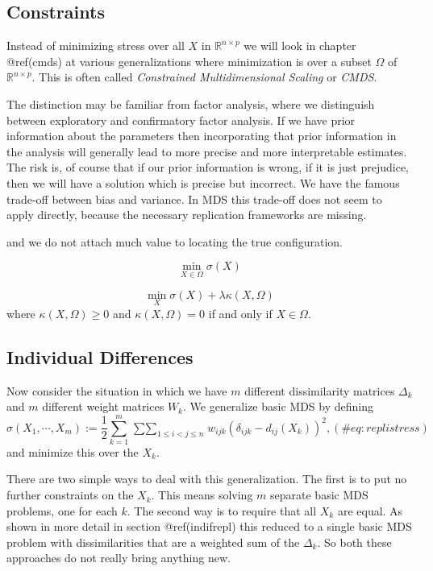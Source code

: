 \documentclass[
  12pt,
  letterpaper,
  DIV=11,
  numbers=noendperiod]{scrreprt}
\theoremstyle{remark}
\begin{document}
\subsection{Constraints}\label{gencons}

Instead of minimizing stress over all \(X\) in
\(\mathbb{R}^{n\times p}\) we will look in chapter @ref(cmds) at various
generalizations where minimization is over a subset \(\mathcal{\Omega}\)
of \(\mathbb{R}^{n\times p}\). This is often called \emph{Constrained
Multidimensional Scaling} or \emph{CMDS}.

The distinction may be familiar from factor analysis, where we
distinguish between exploratory and confirmatory factor analysis. If we
have prior information about the parameters then incorporating that
prior information in the analysis will generally lead to more precise
and more interpretable estimates. The risk is, of course that if our
prior information is wrong, if it is just prejudice, then we will have a
solution which is precise but incorrect. We have the famous trade-off
between bias and variance. In MDS this trade-off does not seem to apply
directly, because the necessary replication frameworks are missing.

and we do not attach much value to locating the true configuration.

\[
\min_{X\in\Omega}\sigma(X)
\]

\[
\min_X\sigma(X)+\lambda\kappa(X,\Omega)
\] where \(\kappa(X,\Omega)\geq 0\) and \(\kappa(X,\Omega)=0\) if and
only if \(X\in\Omega\).

\subsection{Individual Differences}\label{inreplic}

Now consider the situation in which we have \(m\) different
dissimilarity matrices \(\Delta_k\) and \(m\) different weight matrices
\(W_k\). We generalize basic MDS by defining \begin{equation}
\sigma(X_1,\cdots,X_m):=\frac12\sum_{k=1}^m\mathop{\sum\sum}_{1\leq i<j\leq n}w_{ijk}(\delta_{ijk}-d_{ij}(X_k))^2,
(\#eq:replistress)
\end{equation} and minimize this over the \(X_k\).

There are two simple ways to deal with this generalization. The first is
to put no further constraints on the \(X_k\). This means solving \(m\)
separate basic MDS problems, one for each \(k\). The second way is to
require that all \(X_k\) are equal. As shown in more detail in section
@ref(indifrepl) this reduced to a single basic MDS problem with
dissimilarities that are a weighted sum of the \(\Delta_k\). So both
these approaches do not really bring anything new.
\end{document}

